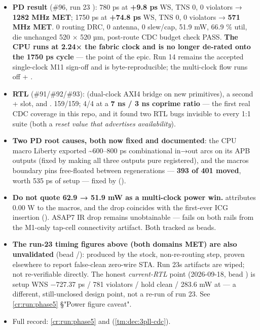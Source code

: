 \begin{record}
\begin{itemize}
\tightlist
\item
  \textbf{PD result} (\#96, run 23 ):
   780 ps at \textbf{+9.8 ps} WS, TNS 0, 0 violators →
  \textbf{1282 MHz MET};  1750 ps at \textbf{+74.8 ps} WS,
  TNS 0, 0 violators → \textbf{571 MHz MET}. 0 routing DRC, 0 antenna, 0
  slew/cap, 51.9 mW, 66.9 \% util, die unchanged 520 × 520 µm,
  post-route CDC budget check PASS. \textbf{The CPU runs at 2.24× the
  fabric clock and is no longer de-rated onto the 1750 ps cycle} --- the
  point of the epic. Run 14 remains the accepted single-clock M11
  sign-off and is byte-reproducible; the multi-clock flow runs off
   +
  .
\item
  \textbf{RTL} (\#91/\allowbreak{}\#92/\allowbreak{}\#93):
   (dual-clock AXI4 bridge on new
   primitives), a second  +
   slot, and .
   159/159;  4/4 at a \textbf{7 ns /
  3 ns coprime ratio} --- the first real CDC coverage in this repo, and
  it found two RTL bugs invisible to every 1:1 suite (both a \emph{reset
  value that advertises availability}).
\item
  \textbf{Two PD root causes, both now fixed and documented}: the CPU
  macro Liberty exported \textasciitilde600--800 ps combinational in→out
  arcs on its APB outputs (fixed by making all three outputs pure
  registered), and the macro\textquotesingle s boundary pins
  free-floated between regenerations --- \textbf{393 of 401 moved},
  worth 535 ps of setup --- fixed by 
  ().
\item
  \warn{} \textbf{Do not quote 62.9 → 51.9 mW as a multi-clock power
  win.}  attributes 0.00 W to the macros, and the
  drop coincides with the first-ever ICG insertion
  (). ASAP7 IR drop remains unobtainable ---
   fails  on both rails from the
  M1-only tap-cell connectivity artifact. Both tracked as beads.
\item
  \warn{} \textbf{The run-23 timing figures above (both domains MET) are
  also unvalidated} (bead /): produced by the stock,
  non-re-routing  step, proven elsewhere to
  report false-clean zero-wire STA. Run 23\textquotesingle s artifacts
  are wiped; not re-verifiable directly. \ok{} The honest
  \emph{current-RTL} point (2026-09-18, bead ) is setup WNS
  −727.37 ps / 781 violators / hold clean / 283.6 mW at
   --- a different, still-unclosed design
  point, not a re-run of run 23. See \cref{cr:run:phase5}
  §"Power figure caveat".
\item
  Full record: \cref{cr:run:phase5}
  and  (\cref{tm:dec:3pll-cdc}).
\end{itemize}


\end{record}

